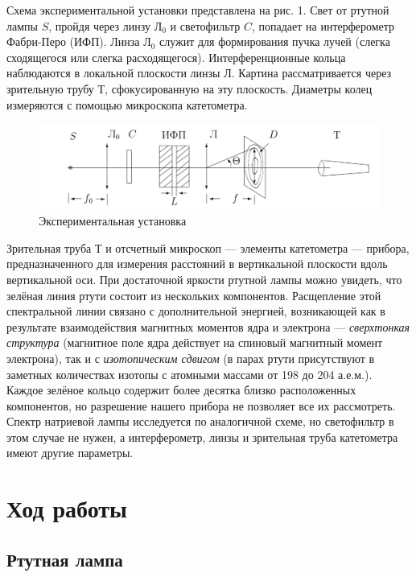 \documentclass[12pt]{kiarticle}
\begin{document}
	Схема экспериментальной установки представлена на рис. 1. Свет от ртутной лампы $ S $, пройдя через линзу $ Л_0 $ и светофильтр $ C $, попадает на интерферометр Фабри-Перо (ИФП). Линза $ Л_0 $ служит для
	формирования пучка лучей (слегка сходящегося или слегка расходящегося). Интерференционные кольца наблюдаются в локальной плоскости линзы $ Л $. Картина рассматривается через зрительную трубу $ Т $, сфокусированную на эту плоскость. Диаметры колец измеряются с помощью микроскопа катетометра.
	
		\begin{figure}[h!]
		\centering
		\includegraphics[width=\linewidth]{lab.png}
		\caption{Экспериментальная установка}
		\label{lab}
	\end{figure}

	
	Зрительная труба $ Т $ и отсчетный микроскоп  --- элементы катетометра --- прибора, предназначенного для измерения расстояний в вертикальной плоскости вдоль вертикальной оси. 
	При достаточной яркости ртутной лампы можно увидеть, что зелёная линия
	ртути состоит из нескольких компонентов. Расщепление этой спектральной линии связано с дополнительной энергией, возникающей как в результате взаимодействия магнитных моментов ядра и электрона --- \textit{сверхтонкая структура} (магнитное поле ядра действует на спиновый магнитный момент электрона), так и с \textit{изотопическим сдвигом} (в парах ртути присутствуют в заметных количествах изотопы с атомными массами от 198 до 204 а.е.м.). Каждое зелёное кольцо содержит более десятка близко расположенных компонентов, но разрешение нашего прибора не позволяет все их рассмотреть.
	Спектр натриевой лампы исследуется по аналогичной схеме, но светофильтр в этом случае не нужен, а интерферометр, линзы и зрительная труба катетометра
	имеют другие параметры.
	
		\section{Ход работы}
		
		\subsection{Ртутная лампа}
		
\end{document}
